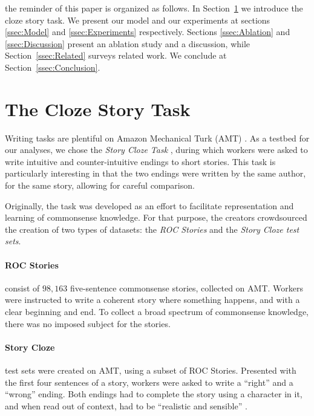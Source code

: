 \documentclass[11pt,a4paper]{article}
\newcommand{\secref}[1]{Section~\ref{ssec:#1}}
\newcommand{\isection}[2]{\section{#1}\label{ssec:#2}}
\newcommand{\ms}[1]{{\color{cyan}\{\textit{#1}\}$_{ms}$}}
\newcommand{\roy}[1]{\footnote{\color{red}{\textbf{Roy: #1}}}}
\renewcommand{\ms}[1]{}
\renewcommand{\roy}[1]{}
\begin{document}
the reminder of this paper is organized as follows. In \secref{ROC_Story} we introduce the cloze story task.
We present our model and our experiments at sections \ref{ssec:Model} and \ref{ssec:Experiments} respectively.
Sections \ref{ssec:Ablation} and \ref{ssec:Discussion} present an ablation study and a discussion, while \secref{Related}  surveys related work. 
We conclude at \secref{Conclusion}.

\isection{The Cloze Story Task}{ROC_Story}
Writing tasks are plentiful on Amazon Mechanical Turk (AMT) \ms{cite various examples?}. As a testbed for our analyses, we chose the \textit{Story Cloze Task} \cite{Mostafazadeh:2016}, during which workers were asked to write intuitive and counter-intuitive endings to short stories. This task is particularly interesting in that the two endings were written by the same author, for the same story, allowing for careful comparison.

Originally, the task was developed as an effort to facilitate representation and learning of commonsense knowledge. For that purpose, the creators crowdsourced the creation of two types of datasets: the \textit{ROC Stories} and the \textit{Story Cloze test sets}.

\paragraph{ROC Stories}
consist of $98,163$ five-sentence commonsense stories, collected on AMT. Workers were instructed to write a coherent story where something happens, and with a clear beginning and end. To collect a broad spectrum of commonsense knowledge, there was no imposed subject for the stories.
\paragraph{Story Cloze} test sets were created on AMT, using a subset of ROC Stories. Presented with the first four sentences of a story, workers were asked to write a ``right'' and a ``wrong'' ending. Both endings had to complete the story using a character in it, and when read out of context, had to be ``realistic and sensible'' \cite{Mostafazadeh:2016}.
\end{document}
